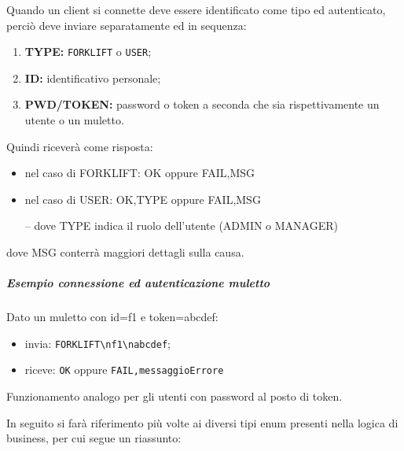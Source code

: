     Quando un client si connette deve essere identificato come tipo ed autenticato, perciò deve inviare separatamente ed in sequenza:
    \begin{enumerate}
        \item \textbf{TYPE: }\texttt{FORKLIFT} o \texttt{USER};
        \item \textbf{ID: } identificativo personale;
        \item \textbf{PWD/TOKEN: } password o token a seconda che sia rispettivamente un utente o un muletto.
    \end{enumerate}
    Quindi riceverà come risposta:
    \begin{itemize}

        \item nel caso di FORKLIFT: OK oppure FAIL,MSG

        \item nel caso di USER: OK,TYPE oppure FAIL,MSG

        \subitem -- dove TYPE indica il ruolo dell’utente (ADMIN o MANAGER)
    \end{itemize}
    dove MSG conterrà maggiori dettagli sulla causa.

    \subparagraph{Esempio connessione ed autenticazione muletto}
        Dato un muletto con id=f1 e token=abcdef:
        \begin{itemize}
            \item invia: \texttt{FORKLIFT\textbackslash nf1\textbackslash nabcdef};

            \item riceve: \texttt{OK} oppure \texttt{FAIL,messaggioErrore}
        \end{itemize}


        Funzionamento analogo per gli utenti con password al posto di token.

\clearpage
{}
    In seguito si farà riferimento più volte ai diversi tipi enum presenti nella logica di business, per cui segue un riassunto:


